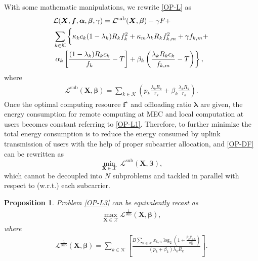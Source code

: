 \documentclass[journal]{IEEEtran}
\newtheorem{proposition}{Proposition}
\begin{document}
    With some mathematic manipulations, we rewrite \eqref{OP-L} as
    \begin{equation}
        \label{OP-L1}
        \begin{aligned}
            & \mathcal{L}(\boldsymbol{X},\boldsymbol{f},\boldsymbol\alpha,\boldsymbol\beta,\gamma) =\mathcal{L}^\text{sub}(\boldsymbol{X},\boldsymbol\beta)-\gamma F+\\
            &\sum_{k\in\mathcal{K}}\left\{\vphantom{\frac{\lambda_{k}R_{k}c_{k}}{f_{k,m}}}\kappa_kc_{k}(1-\lambda_{k})R_kf_{k}^{2}+\kappa_{m}\lambda_{k}R_{k}f_{k,m}^{2}+\gamma f_{k,m}+\right.\\
            &\left.\alpha_{k}\left[\frac{(1-\lambda_{k})R_{k}c_{k}}{f_{k}}-T\right]+\beta_{k}\left(\frac{\lambda_{k}R_{k}c_{k}}{f_{k,m}}-T\right)\right\},
        \end{aligned}
    \end{equation}
    where
    \begin{equation}
        \label{OP-L2}
        \begin{aligned}
            \mathcal{L}^\text{sub}(\boldsymbol{X},\boldsymbol\beta) =
            \sum_{k\in\mathcal{K}}\left(p_{k}\frac{\lambda_{k}R_{k}}{r_{k}}+\beta_{k}\frac{\lambda_{k}R_{k}}{r_{k}}\right).
        \end{aligned}
    \end{equation}
    Once the optimal computing resource $\boldsymbol{f^\star}$ and offloading ratio $\boldsymbol{\lambda}$ are given, the energy consumption for remote computing at MEC and local computation at users becomes constant referring to \eqref{OP-L1}. Therefore, to further minimize the total energy consumption is to reduce the energy consumed by uplink transmission of users with the help of proper subcarrier allocation, and \eqref{OP-DF} can be rewritten as
    \begin{equation}
        \label{OP-L3}
        \min_{\boldsymbol{X}\in \mathcal{X}}~\mathcal{L}^\text{sub}(\boldsymbol{X},\boldsymbol\beta),
    \end{equation}
    which cannot be decoupled into $N$ subproblems and tackled in parallel with respect to (w.r.t.) each subcarrier.
    \begin{proposition}
        Problem \eqref{OP-L3} can be equivalently recast as
        \begin{equation}
            \label{OP-L3a}
            \begin{aligned}
                \max_{\boldsymbol{X}\in \mathcal{X}}\mathcal{L}^{\frac{1}{\text{sub}}}(\boldsymbol{X},\boldsymbol\beta),
            \end{aligned}
        \end{equation}
        where
        \begin{equation}
            \label{OP-L3A}
            \begin{aligned}
                \mathcal{L}^{\frac{1}{\text{sub}}}(\boldsymbol{X},\boldsymbol\beta) \!\!=\!\!
                \sum_{k\in\mathcal{K}}\left[\frac{B\sum_{n\in\mathcal{N}}x_{k,n}\log_2\left(1+\frac{p_{k}g_{k,n}}{\sigma_n^2}\right)}{(p_{k}+\beta_{k})\lambda_{k}R_{k}}\right].
            \end{aligned}
        \end{equation}
    \end{proposition}
\end{document}
